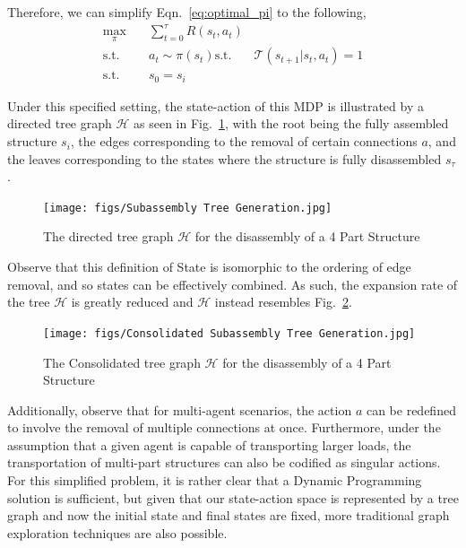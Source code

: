 \documentclass{article}
\begin{document}
Therefore, we can simplify Eqn.~\ref{eq:optimal_pi} to the following,
\begin{equation} \label{eq:optimization}
    \begin{aligned} 
        \max_{\pi} \quad & \sum_{t=0}^{\tau}{R(s_t,a_t)}\\
        \textrm{s.t.} \quad & a_t \sim \pi(s_t)
        \textrm{s.t.} \quad & \mathcal{T}(s_{t+1}|s_t,a_t) = 1\\
        \textrm{s.t.} \quad & s_0 = s_i
    \end{aligned}
\end{equation}

Under this specified setting, the state-action of this MDP is illustrated by a directed tree graph $\mathcal{H}$ as seen in Fig.~\ref{fig: treeGen}, with the root being the fully assembled structure $s_i$, the edges corresponding to the removal of certain connections $a$, and the leaves corresponding to the states where the structure is fully disassembled $s_\tau$.

\begin{figure}[h!]
\centering
\texttt{[image: figs/Subassembly Tree Generation.jpg]}
  \caption{The directed tree graph $\mathcal{H}$ for the disassembly of a 4 Part Structure}
  \label{fig: treeGen}
\end{figure}

Observe that this definition of State is isomorphic to the ordering of edge removal, and so states can be effectively combined. As such, the expansion rate of the tree $\mathcal{H}$ is greatly reduced and $\mathcal{H}$ instead resembles Fig.~\ref{fig: treeGen2}.

\begin{figure}[!h]
\centering
\texttt{[image: figs/Consolidated Subassembly Tree Generation.jpg]}
  \caption{The Consolidated tree graph  $\mathcal{H}$ for the disassembly of a 4 Part Structure}
  \label{fig: treeGen2}
\end{figure}

Additionally, observe that for multi-agent scenarios, the action $a$ can be redefined to involve the removal of multiple connections at once. Furthermore, under the assumption that a given agent is capable of transporting larger loads, the transportation of multi-part structures can also be codified as singular actions. For this simplified problem, it is rather clear that a Dynamic Programming solution is sufficient, but given that our state-action space is represented by a tree graph and now the initial state and final states are fixed, more traditional graph exploration techniques are also possible.
\end{document}

